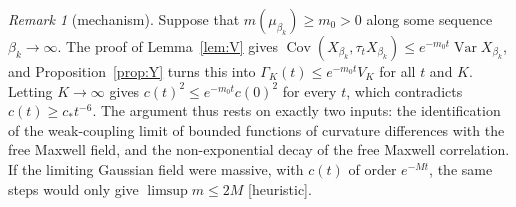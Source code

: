 \documentclass[11pt,a4paper]{article}
\theoremstyle{plain}
\theoremstyle{definition}
\theoremstyle{remark}
\newtheorem{remark}[theorem]{Remark}
\numberwithin{equation}{section}
\newcommand{\Var}{\operatorname{Var}}
\newcommand{\Cov}{\operatorname{Cov}}
\newcommand{\st}[1]{\textsf{[#1]}}
\begin{document}
\begin{remark}[mechanism]\label{rem:mechanism}
Suppose that $m(\mu_{\beta_k})\ge m_0>0$ along some sequence $\beta_k\to\infty$. The proof of Lemma~\ref{lem:V} gives
$\Cov(X_{\beta_k},\tau_tX_{\beta_k})\le e^{-m_0t}\Var X_{\beta_k}$, and Proposition~\ref{prop:Y} turns this into
$\Gamma_K(t)\le e^{-m_0t}V_K$ for all $t$ and $K$. Letting $K\to\infty$ gives $c(t)^2\le e^{-m_0t}c(0)^2$ for every $t$, which contradicts
$c(t)\ge c_*t^{-6}$. The argument thus rests on exactly two inputs: the identification of the weak-coupling limit of bounded functions of
curvature differences with the free Maxwell field, and the non-exponential decay of the free Maxwell correlation. If the limiting
Gaussian field were massive, with $c(t)$ of order $e^{-Mt}$, the same steps would only give $\limsup m\le2M$ \st{heuristic}.
\end{remark}
\end{document}
